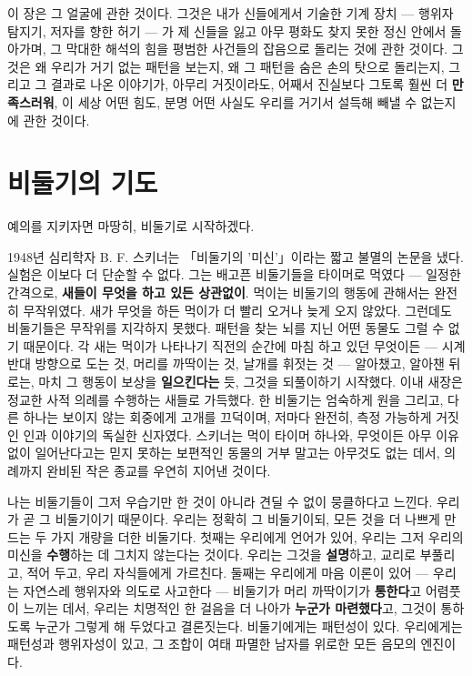 이 장은 그 얼굴에 관한 것이다. 그것은 내가 신들에게서 기술한 기계 장치 — 행위자 탐지기, 저자를 향한 허기 — 가 제 신들을 잃고 아무 평화도 찾지 못한 정신 안에서 돌아가며, 그 막대한 해석의 힘을 평범한 사건들의 잡음으로 돌리는 것에 관한 것이다. 그것은 왜 우리가 거기 없는 패턴을 보는지, 왜 그 패턴을 숨은 손의 탓으로 돌리는지, 그리고 그 결과로 나온 이야기가, 아무리 거짓이라도, 어째서 진실보다 그토록 훨씬 더 \textbf{만족스러워}, 이 세상 어떤 힘도, 분명 어떤 사실도 우리를 거기서 설득해 빼낼 수 없는지에 관한 것이다.

\section*{비둘기의 기도}

예의를 지키자면 마땅히, 비둘기로 시작하겠다.

1948년 심리학자 B. F. 스키너는 「비둘기의 '미신'」이라는 짧고 불멸의 논문을 냈다. 실험은 이보다 더 단순할 수 없다. 그는 배고픈 비둘기들을 타이머로 먹였다 — 일정한 간격으로, \textbf{새들이 무엇을 하고 있든 상관없이}. 먹이는 비둘기의 행동에 관해서는 완전히 무작위였다. 새가 무엇을 하든 먹이가 더 빨리 오거나 늦게 오지 않았다. 그런데도 비둘기들은 무작위를 지각하지 못했다. 패턴을 찾는 뇌를 지닌 어떤 동물도 그럴 수 없기 때문이다. 각 새는 먹이가 나타나기 직전의 순간에 마침 하고 있던 무엇이든 — 시계 반대 방향으로 도는 것, 머리를 까딱이는 것, 날개를 휘젓는 것 — 알아챘고, 알아챈 뒤로는, 마치 그 행동이 보상을 \textbf{일으킨다는} 듯, 그것을 되풀이하기 시작했다. 이내 새장은 정교한 사적 의례를 수행하는 새들로 가득했다. 한 비둘기는 엄숙하게 원을 그리고, 다른 하나는 보이지 않는 회중에게 고개를 끄덕이며, 저마다 완전히, 측정 가능하게 거짓인 인과 이야기의 독실한 신자였다. 스키너는 먹이 타이머 하나와, 무엇이든 아무 이유 없이 일어난다고는 믿지 못하는 보편적인 동물의 거부 말고는 아무것도 없는 데서, 의례까지 완비된 작은 종교를 우연히 지어낸 것이다.

나는 비둘기들이 그저 우습기만 한 것이 아니라 견딜 수 없이 뭉클하다고 느낀다. 우리가 곧 그 비둘기이기 때문이다. 우리는 정확히 그 비둘기이되, 모든 것을 더 나쁘게 만드는 두 가지 개량을 더한 비둘기다. 첫째는 우리에게 언어가 있어, 우리는 그저 우리의 미신을 \textbf{수행}하는 데 그치지 않는다는 것이다. 우리는 그것을 \textbf{설명}하고, 교리로 부풀리고, 적어 두고, 우리 자식들에게 가르친다. 둘째는 우리에게 마음 이론이 있어 — 우리는 자연스레 행위자와 의도로 사고한다 — 비둘기가 머리 까딱이기가 \textbf{통한다}고 어렴풋이 느끼는 데서, 우리는 치명적인 한 걸음을 더 나아가 \textbf{누군가 마련했다}고, 그것이 통하도록 누군가 그렇게 해 두었다고 결론짓는다. 비둘기에게는 패턴성이 있다. 우리에게는 패턴성과 행위자성이 있고, 그 조합이 여태 파멸한 남자를 위로한 모든 음모의 엔진이다.

